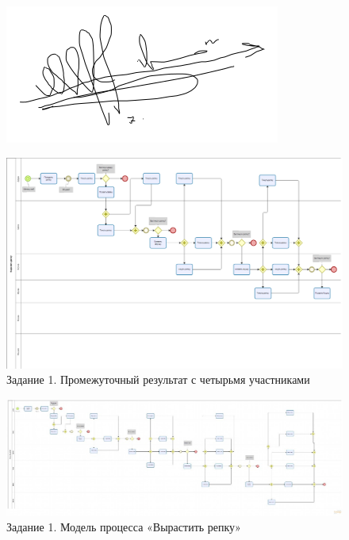 \documentclass[a4paper,14pt]{extarticle}
\begin{document}
\begin{figure}
	\centering
	\includegraphics[width=0.7\linewidth]{../../../Common/signature}
	\caption{}
	\label{fig:signature}
\end{figure}


	\begin{figure}[htpb]
	\centering
	\includegraphics[width=0.8\linewidth]{images/pr10-repka1.2}
		\caption{Задание 1. Промежуточный результат с четырьмя участниками}
	\label{fig:pr10-repka1.2}
\end{figure}

\newpage	
	
	\begin{landscape}
	\begin{figure}[htpb]
		\centering
		\includegraphics[width=\linewidth]{images/pr10-repka1}
		\caption{Задание 1. Модель процесса «Вырастить репку»}
		\label{fig:pr10-repka1.3}
	\end{figure}
	
\end{landscape}
\end{document}
